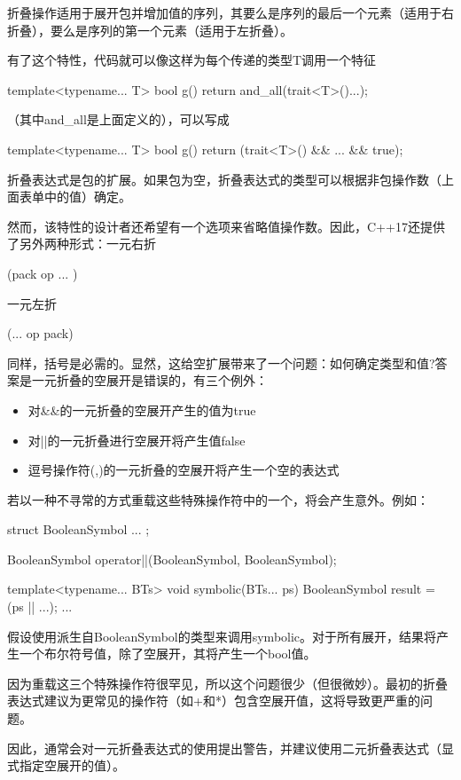 折叠操作适用于展开包并增加值的序列，其要么是序列的最后一个元素（适用于右折叠），要么是序列的第一个元素（适用于左折叠）。

有了这个特性，代码就可以像这样为每个传递的类型T调用一个特征

\begin{cpp}
template<typename... T> bool g() {
	return and_all(trait<T>()...);
}
\end{cpp}

（其中and\_all是上面定义的），可以写成

\begin{cpp}
template<typename... T> bool g() {
	return (trait<T>() && ... && true);
}
\end{cpp}

折叠表达式是包的扩展。如果包为空，折叠表达式的类型可以根据非包操作数（上面表单中的值）确定。

然而，该特性的设计者还希望有一个选项来省略值操作数。因此，C++17还提供了另外两种形式：一元右折

\begin{cpp}
(pack op ... )
\end{cpp}

一元左折

\begin{cpp}
(... op pack)
\end{cpp}

同样，括号是必需的。显然，这给空扩展带来了一个问题：如何确定类型和值?答案是一元折叠的空展开是错误的，有三个例外：

\begin{itemize}
\item
对\&\&的一元折叠的空展开产生的值为true

\item
对||的一元折叠进行空展开将产生值false

\item
逗号操作符(,)的一元折叠的空展开将产生一个空的表达式
\end{itemize}

若以一种不寻常的方式重载这些特殊操作符中的一个，将会产生意外。例如：

\begin{cpp}
struct BooleanSymbol {
	...
};

BooleanSymbol operator||(BooleanSymbol, BooleanSymbol);

template<typename... BTs> void symbolic(BTs... ps) {
	BooleanSymbol result = (ps || ...);
	...
}
\end{cpp}

假设使用派生自BooleanSymbol的类型来调用symbolic。对于所有展开，结果将产生一个布尔符号值，除了空展开，其将产生一个bool值。

\begin{notice}
因为重载这三个特殊操作符很罕见，所以这个问题很少（但很微妙）。最初的折叠表达式建议为更常见的操作符（如+和*）包含空展开值，这将导致更严重的问题。
\end{notice}

因此，通常会对一元折叠表达式的使用提出警告，并建议使用二元折叠表达式（显式指定空展开的值）。






